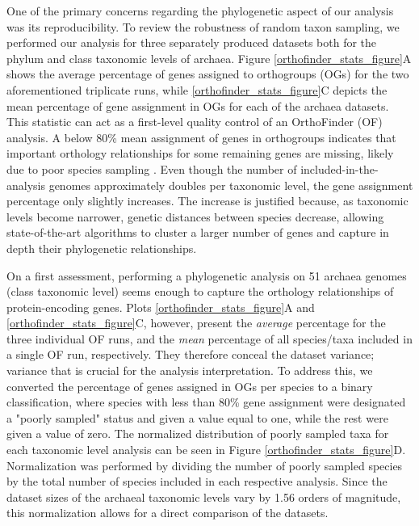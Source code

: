 One of the primary concerns regarding the phylogenetic aspect of our analysis was its reproducibility. To review the robustness of random taxon sampling, we performed our analysis for three separately produced datasets both for the phylum and class taxonomic levels of archaea. Figure \ref{orthofinder_stats_figure}A shows the average percentage of genes assigned to orthogroups (OGs) for the two aforementioned triplicate runs, while \ref{orthofinder_stats_figure}C depicts the mean percentage of gene assignment in OGs for each of the archaea datasets. This statistic can act as a first-level quality control of an OrthoFinder (OF) analysis. A below 80\% mean assignment of genes in orthogroups indicates that important orthology relationships for some remaining genes are missing, likely due to poor species sampling \cite{emms2015}. Even though the number of included-in-the-analysis genomes approximately doubles per taxonomic level, the gene assignment percentage only slightly increases. The increase is justified because, as taxonomic levels become narrower, genetic distances between species decrease, allowing state-of-the-art algorithms to cluster a larger number of genes and capture in depth their phylogenetic relationships.

On a first assessment, performing a phylogenetic analysis on 51 archaea genomes (class taxonomic level) seems enough to capture the orthology relationships of protein-encoding genes. Plots \ref{orthofinder_stats_figure}A and \ref{orthofinder_stats_figure}C, however, present the \textit{average} percentage for the three individual OF runs, and the \textit{mean} percentage of all species/taxa included in a single OF run, respectively. They therefore conceal the dataset variance; variance that is crucial for the analysis interpretation. To address this, we converted the percentage of genes assigned in OGs per species to a binary classification, where species with less than 80\% gene assignment were designated a "poorly sampled" status and given a value equal to one, while the rest were given a value of zero. The normalized distribution of poorly sampled taxa for each taxonomic level analysis can be seen in Figure \ref{orthofinder_stats_figure}D. Normalization was performed by dividing the number of poorly sampled species by the total number of species included in each respective analysis. Since the dataset sizes of the archaeal taxonomic levels vary by 1.56 orders of magnitude, this normalization allows for a direct comparison of the datasets.

